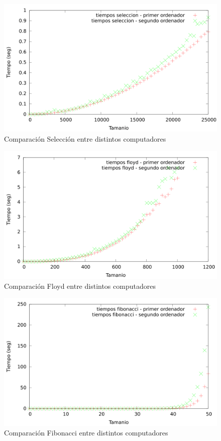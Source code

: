\documentclass{article}
\begin{document}
	\begin{figure}[h]
		\centering
		\includegraphics[totalheight=8cm]{img/compSeleccion}
		\caption{Comparación Selección entre distintos computadores}
		\label{fig:compSeleccion}
	\end{figure}
	
	\begin{figure}[h]
		\centering
		\includegraphics[totalheight=8cm]{img/compFloyd}
		\caption{Comparación Floyd entre distintos computadores}
		\label{fig:compFloyd}
	\end{figure}
	
	\begin{figure}[h]
		\centering
		\includegraphics[totalheight=8cm]{img/compFibonacci}
		\caption{Comparación Fibonacci entre distintos computadores}
		\label{fig:compFibonacci}
	\end{figure}
	
\end{document}
